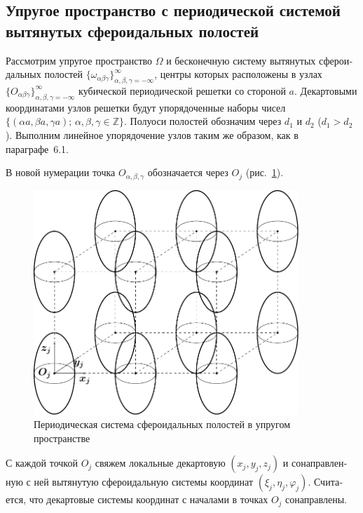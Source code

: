 \begin{russian}

\section[Упругое пространство с периодической системой вытянутых сфероидальных полостей]{Упругое пространство с периодической системой вытянутых сфероидальных полостей}

Рассмотрим упругое пространство $\Omega$ и бесконечную систему вытянутых сфероидальных полостей $\{\omega_{\alpha\beta\gamma}\}_{\alpha,\beta,\gamma=-\infty}^\infty$, центры которых расположены в узлах $\{O_{\alpha\beta\gamma}\}_{\alpha,\beta,\gamma=-\infty}^\infty$ кубической периодической решетки со стороной $a$. Декартовыми координатами узлов решетки будут упорядоченные наборы чисел $\{(\alpha a,\beta a,\gamma a);\,\alpha,\beta,\gamma\in\mathbb{Z}\}$. Полуоси полостей обозначим через $d_1$ и $d_2$ ($d_1>d_2$). Выполним линейное упорядочение узлов таким же образом, как в параграфе~6.1.\sloppy

В новой нумерации точка $O_{\alpha,\beta,\gamma}$ обозначается через $O_j$ (рис.~\ref{f:11:1a}).

\begin{figure}[h!]
\centering
\includegraphics[width=10cm]{cartesian-spheroids-periodic.pdf}
\caption{Периодическая система сфероидальных полостей в упругом пространстве}
\label{f:11:1a}
\end{figure}

С каждой точкой $O_j$ свяжем локальные декартовую $(x_j,y_j,z_j)$ и сонаправленную с ней вытянутую сфероидальную системы координат $(\xi_j,\eta_j,\varphi_j)$. Считается, что декартовые системы координат с началами в точках $O_j$ сонаправлены.


\end{russian}
